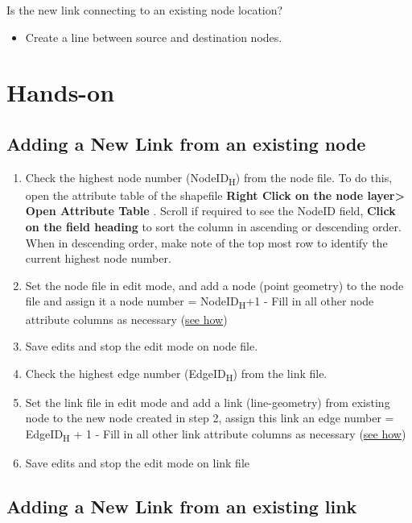 \documentclass[
]{book}
\providecommand{\tightlist}{%
  \setlength{\itemsep}{0pt}\setlength{\parskip}{0pt}}
\begin{document}
Is the new link connecting to an existing node location?

\begin{itemize}
\tightlist
\item
  Create a line between source and destination nodes.
\end{itemize}

\section{Hands-on}\label{hands-on}

\subsection{Adding a New Link from an existing node}\label{adding-a-new-link-from-an-existing-node}

\begin{enumerate}
\def\labelenumi{\arabic{enumi}.}
\tightlist
\item
  Check the highest node number (NodeID\textsubscript{H}) from the node file. To do this, open the attribute table of the shapefile \textbf{Right Click on the node layer\textgreater{} Open Attribute Table} . Scroll if required to see the NodeID field, \textbf{Click on the field heading} to sort the column in ascending or descending order. When in descending order, make note of the top most row to identify the current highest node number.
\item
  Set the node file in edit mode, and add a node (point geometry) to the node file and assign it a node number = NodeID\textsubscript{H}+1
  - Fill in all other node attribute columns as necessary (\hyperref[modifying-node-attributes]{see how})
\item
  Save edits and stop the edit mode on node file.
\item
  Check the highest edge number (EdgeID\textsubscript{H}) from the link file.
\item
  Set the link file in edit mode and add a link (line-geometry) from existing node to the new node created in step 2, assign this link an edge number = EdgeID\textsubscript{H} + 1
  - Fill in all other link attribute columns as necessary (\hyperref[modifying-edge-attributes]{see how})
\item
  Save edits and stop the edit mode on link file
\end{enumerate}

\subsection{Adding a New Link from an existing link}\label{adding-a-new-link-from-an-existing-link}
\end{document}
